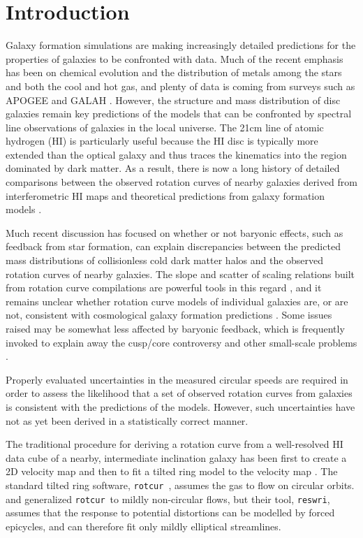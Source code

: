 \documentclass[letterpaper,fleqn,usenatbib]{mnras}
\def\eg{{\it e.g.}}
\def\rtc{{\tt rotcur}}
\begin{document}
\section{Introduction}
\label{sec.intro}
Galaxy formation simulations \citep[see][for a recent review]{SD15}
are making increasingly detailed predictions for the properties of
galaxies to be confronted with data.  Much of the recent emphasis has
been on chemical evolution and the distribution of metals among the
stars and both the cool and hot gas, and plenty of data is coming from
surveys such as APOGEE \citep{Ma17} and GALAH \citep{deS15}.  However,
the structure and mass distribution of disc galaxies remain key
predictions of the models \citep[\eg][]{Buck20, Vogel20, Well20} that
can be confronted by spectral line observations of galaxies in the
local universe.  The 21cm line of atomic hydrogen (HI) is particularly
useful because the HI disc is typically more extended than the optical
galaxy and thus traces the kinematics into the region dominated by
dark matter.  As a result, there is now a long history of detailed
comparisons between the observed rotation curves of nearby galaxies
derived from interferometric HI maps and theoretical predictions from
galaxy formation models \citep[see][for reviews]{deB10, Le16}.

Much recent discussion has focused on whether or not baryonic effects,
such as feedback from star formation, can explain discrepancies
between the predicted mass distributions of collisionless cold dark
matter halos and the observed rotation curves of nearby galaxies.  The
slope and scatter of scaling relations built from rotation curve
compilations are powerful tools in this regard \citep{Du07, Le16,
  Po19}, and it remains unclear whether rotation curve models of
individual galaxies are, or are not, consistent with cosmological
galaxy formation predictions \citep[\eg][]{Oh11, Oman15, Ka17, Ha18,
  Ma20}.  Some issues raised may be somewhat less affected by baryonic
feedback, which is frequently invoked to explain away the cusp/core
controversy and other small-scale problems \citep[reviewed
  by][]{We15}.

Properly evaluated uncertainties in the measured circular speeds are
required in order to assess the likelihood that a set of observed
rotation curves from galaxies is consistent with the predictions of
the models.  However, such uncertainties have not as yet been derived
in a statistically correct manner.

The traditional procedure for deriving a rotation curve from a
well-resolved HI data cube of a nearby, intermediate inclination
galaxy has been first to create a 2D velocity map and then to fit a
tilted ring model to the velocity map \citep{RLW}.  The standard
tilted ring software, \rtc\ \citep{Be89}, assumes the gas to flow on
circular orbits.  \citet{FvGdZ} and \citet{Sc97} generalized \rtc\ to
mildly non-circular flows, but their tool, {\tt reswri}, assumes that
the response to potential distortions can be modelled by forced
epicycles, and can therefore fit only mildly elliptical streamlines.
\end{document}
